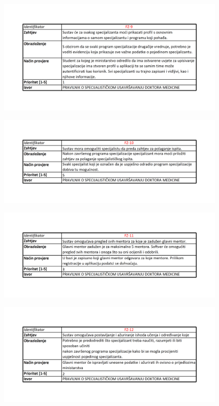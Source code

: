 \documentclass{scrreprt}
\begin{document}
\begin{figure}[h!]
    \centering
    \includegraphics[width=1\textwidth]{slike/9.png}
\end{figure}
\begin{figure}[h!]
    \centering
    \includegraphics[width=1\textwidth]{slike/10.png}
\end{figure}
\begin{figure}[h!]
    \centering
    \includegraphics[width=1\textwidth]{slike/11.png}
\end{figure}
\begin{figure}[h!]
    \centering
    \includegraphics[width=1\textwidth]{slike/12.png}
\end{figure}
\end{document}
